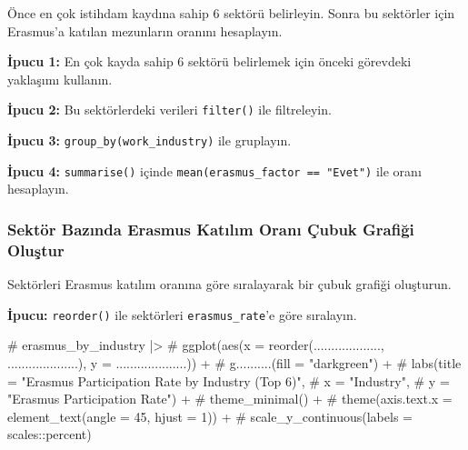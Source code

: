 \documentclass[
  11pt,
  a4paper,
  DIV=11,
  numbers=noendperiod]{scrartcl}
\newenvironment{Shaded}{\begin{snugshade}}{\end{snugshade}}
\newcommand{\CommentTok}[1]{\textcolor[rgb]{0.37,0.37,0.37}{#1}}
\begin{document}
Önce en çok istihdam kaydına sahip 6 sektörü belirleyin. Sonra bu
sektörler için Erasmus'a katılan mezunların oranını hesaplayın.

\textbf{İpucu 1:} En çok kayda sahip 6 sektörü belirlemek için önceki
görevdeki yaklaşımı kullanın.

\textbf{İpucu 2:} Bu sektörlerdeki verileri \texttt{filter()} ile
filtreleyin.

\textbf{İpucu 3:} \texttt{group\_by(work\_industry)} ile gruplayın.

\textbf{İpucu 4:} \texttt{summarise()} içinde
\texttt{mean(erasmus\_factor\ ==\ "Evet")} ile oranı hesaplayın.

\begin{Shaded}
\end{Shaded}

\subsubsection{Sektör Bazında Erasmus Katılım Oranı Çubuk Grafiği
Oluştur}\label{sektuxf6r-bazux131nda-erasmus-katux131lux131m-oranux131-uxe7ubuk-grafiux11fi-oluux15ftur}

Sektörleri Erasmus katılım oranına göre sıralayarak bir çubuk grafiği
oluşturun.

\textbf{İpucu:} \texttt{reorder()} ile sektörleri
\texttt{erasmus\_rate}'e göre sıralayın.

\begin{Shaded}
\begin{Highlighting}[]
\CommentTok{\# erasmus\_by\_industry |\textgreater{}}
\CommentTok{\#   ggplot(aes(x = reorder(..................., ....................), y = ....................)) +}
\CommentTok{\#   g..........(fill = "darkgreen") +}
\CommentTok{\#   labs(title = "Erasmus Participation Rate by Industry (Top 6)",}
\CommentTok{\#        x = "Industry",}
\CommentTok{\#        y = "Erasmus Participation Rate") +}
\CommentTok{\#   theme\_minimal() +}
\CommentTok{\#   theme(axis.text.x = element\_text(angle = 45, hjust = 1)) +}
\CommentTok{\#   scale\_y\_continuous(labels = scales::percent)}
\end{Highlighting}
\end{Shaded}
\end{document}
